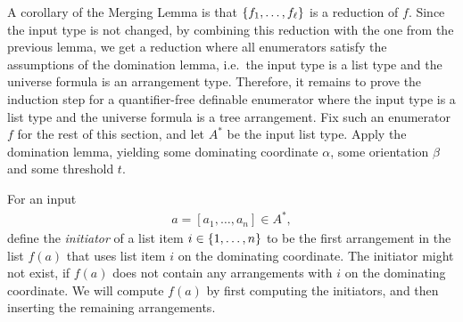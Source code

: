A corollary of the Merging Lemma is that $\{f_1,\ldots,f_\ell\}$ is a reduction of $f$.  Since the input type is not changed, by combining this reduction with the one from the  previous lemma, we get a reduction where all enumerators satisfy the assumptions of the domination lemma, i.e.~the input type is a list type and the universe formula is an arrangement type. Therefore, it remains to prove the induction step for a quantifier-free definable enumerator where the input type is a list type and the universe formula is a tree arrangement.  Fix such an enumerator $f$ for the rest of this section, and let $A^*$ be the input list type. Apply the domination lemma, yielding some dominating coordinate $\alpha$, some orientation $\beta$  and some threshold $t$.  


For an input 
\begin{align*}
a = [a_1,\ldots,a_n] \in A^*,
\end{align*}
define the \emph{initiator} of a list item $i \in \{1,\ldots,n\}$ to be the first arrangement in the list $f(a)$ that uses list item $i$ on the dominating coordinate. The initiator might not exist, if $f(a)$ does not contain any arrangements with $i$ on the dominating coordinate. We will compute $f(a)$ by first computing the initiators, and then inserting the remaining arrangements.



